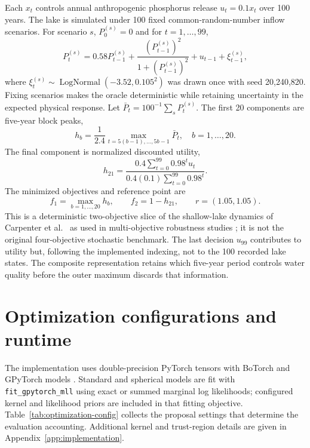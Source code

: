 \documentclass{article}
\begin{document}
Each $x_t$ controls annual anthropogenic phosphorus release
$u_t=0.1x_t$ over 100 years.  The lake is simulated under 100 fixed
common-random-number inflow scenarios.  For scenario $s$, $P_0^{(s)}=0$ and
for $t=1,\ldots,99$,
\begin{equation}
P_t^{(s)}=0.58P_{t-1}^{(s)}+
\frac{(P_{t-1}^{(s)})^2}{1+(P_{t-1}^{(s)})^2}
+u_{t-1}+\xi_{t-1}^{(s)},
\label{eq:lake-dynamics}
\end{equation}
where
$\xi_t^{(s)}\sim\operatorname{LogNormal}(-3.52,0.105^2)$ was drawn once with
seed 20,240,820.  Fixing scenarios makes the oracle deterministic while
retaining uncertainty in the expected physical response.  Let
$\bar P_t=100^{-1}\sum_sP_t^{(s)}$.  The first 20 components are five-year
block peaks,
\begin{equation}
h_b=\frac1{2.4}\max_{t=5(b-1),\ldots,5b-1}\bar P_t,
\quad b=1,\ldots,20.
\end{equation}
The final component is normalized discounted utility,
\begin{equation}
h_{21}=\frac{0.4\sum_{t=0}^{99}0.98^tu_t}
 {0.4(0.1)\sum_{t=0}^{99}0.98^t}.
\end{equation}
The minimized objectives and reference point are
\begin{equation}
 f_1=\max_{b=1,\ldots,20}h_b,\qquad
 f_2=1-h_{21},\qquad r=(1.05,1.05).
 \label{eq:lake-objectives}
\end{equation}
This is a deterministic two-objective slice of the shallow-lake dynamics of
Carpenter et al.\ \cite{carpenter1999lake} as used in multi-objective robustness
studies \cite{ward2015tipping}; it is not the original four-objective stochastic
benchmark.  The last decision $u_{99}$ contributes to utility but, following
the implemented indexing, not to the 100 recorded lake states.  The composite
representation retains which five-year period controls water quality before
the outer maximum discards that information.

\section{Optimization configurations and runtime}
\label{app:runtime}

The implementation uses double-precision PyTorch tensors with BoTorch and
GPyTorch models \cite{balandat2020botorch}.  Standard and spherical models are
fit with \texttt{fit\_gpytorch\_mll} using exact or summed marginal log
likelihoods; configured kernel and likelihood priors are included in that
fitting objective.  Table~\ref{tab:optimization-config} collects the proposal
settings that determine the evaluation accounting.  Additional kernel and
trust-region details are given in Appendix~\ref{app:implementation}.
\end{document}
